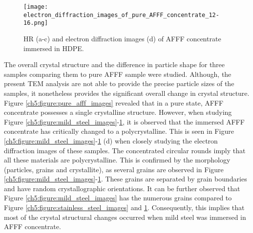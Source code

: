 \begin{figure}[H]
\centering

\texttt{[image: electron\_diffraction\_images\_of\_pure\_AFFF\_concentrate\_12-16.png]}

\caption{HR (a-c) and electron diffraction images (d) of AFFF concentrate immersed in HDPE.}
\label{ch5:figure:hdpe_images}
\end{figure}

The overall crystal structure and the difference in particle shape for three samples comparing them to pure AFFF sample were studied. Although, the present TEM analysis are not able to provide the precise particle sizes of the samples, it nonetheless provides the significant overall change in crystal structure. Figure \ref{ch5:figure:pure_afff_images} revealed that in a pure state, AFFF concentrate possesses a single crystalline structure. However, when studying Figure \ref{ch5:figure:mild_steel_images}-\ref{ch5:figure:hdpe_images}, it is observed that the immersed AFFF concentrate has critically changed to a polycrystalline. This is seen in Figure \ref{ch5:figure:mild_steel_images}-\ref{ch5:figure:hdpe_images} (d) when closely studying the electron diffraction images of these samples. The concentrated circular rounds imply that all these materials are polycrystalline. This is confirmed by the morphology (particles, grains and crystallite), as several grains are observed in Figure \ref{ch5:figure:mild_steel_images}-\ref{ch5:figure:hdpe_images}. These grains are separated by grain boundaries and have random crystallographic orientations. It can be further observed that Figure \ref{ch5:figure:mild_steel_images} has the numerous grains compared to Figure \ref{ch5:figure:stainless_steel_images} and \ref{ch5:figure:hdpe_images}.  Consequently, this implies that most of the crystal structural changes occurred when mild steel was immersed in AFFF concentrate. 

